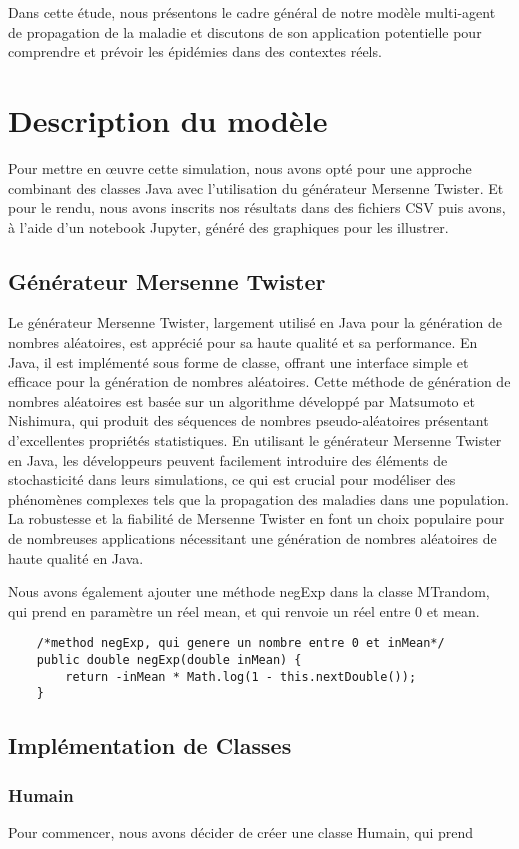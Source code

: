 \documentclass[french]{article}
\begin{document}
Dans cette étude, nous présentons le cadre général de notre modèle multi-agent de propagation de la maladie et discutons de son application potentielle pour comprendre et prévoir les épidémies dans des contextes réels.

\section{Description du modèle}

Pour mettre en œuvre cette simulation, nous avons opté pour une approche combinant des classes Java avec l'utilisation du générateur Mersenne Twister. Et pour le rendu, nous avons inscrits nos résultats dans des fichiers CSV puis avons, à l'aide d'un notebook Jupyter, généré des graphiques pour les illustrer.

\subsection{Générateur Mersenne Twister}

Le générateur Mersenne Twister, largement utilisé en Java pour la génération de nombres aléatoires, est apprécié pour sa haute qualité et sa performance. En Java, il est implémenté sous forme de classe, offrant une interface simple et efficace pour la génération de nombres aléatoires. Cette méthode de génération de nombres aléatoires est basée sur un algorithme développé par Matsumoto et Nishimura, qui produit des séquences de nombres pseudo-aléatoires présentant d'excellentes propriétés statistiques. En utilisant le générateur Mersenne Twister en Java, les développeurs peuvent facilement introduire des éléments de stochasticité dans leurs simulations, ce qui est crucial pour modéliser des phénomènes complexes tels que la propagation des maladies dans une population. La robustesse et la fiabilité de Mersenne Twister en font un choix populaire pour de nombreuses applications nécessitant une génération de nombres aléatoires de haute qualité en Java.

Nous avons également ajouter une méthode negExp dans la classe MTrandom, qui prend en paramètre un réel mean, et qui renvoie un réel entre 0 et mean.

\begin{lstlisting}
	/*method negExp, qui genere un nombre entre 0 et inMean*/
	public double negExp(double inMean) {
        return -inMean * Math.log(1 - this.nextDouble());
    }
\end{lstlisting} 

\subsection{Implémentation de Classes}

\subsubsection{Humain}
Pour commencer, nous avons décider de créer une classe Humain, qui prend 
\end{document}
